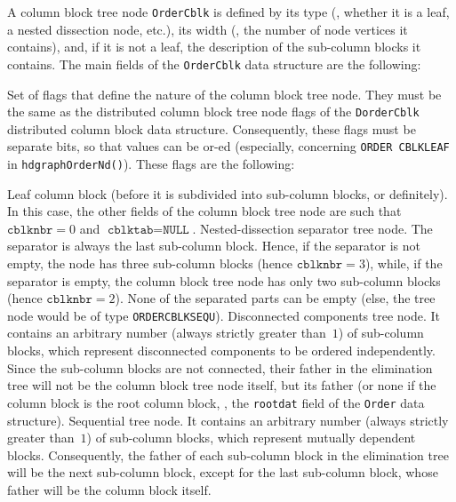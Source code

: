 A column block tree node \texttt{OrderCblk} is defined by its type
(\ie, whether it is a leaf, a nested dissection node, etc.), its width
(\ie, the number of node vertices it contains), and, if it is not a
leaf, the description of the sub-column blocks it contains.
The main fields of the \texttt{OrderCblk} data structure are the
following:
\begin{itemize}
  Set of flags that define the nature of the column block tree
  node. They must be the same as the distributed column block tree
  node flags of the \texttt{Dorder\lbt Cblk} distributed column block
  data structure. Consequently, these flags must be separate bits, so
  that values can be or-ed (especially, concerning \texttt{ORDER\lbt
  CBLK\lbt LEAF} in \texttt{hdgraph\lbt Order\lbt Nd()}).
  These flags are the following:
  \begin{itemize}
    Leaf column block (before it is subdivided into sub-column blocks,
    or definitely). In this case, the other fields of the column block
    tree node are such that $\texttt{cblknbr} = 0$ and
    $\texttt{cblktab} = \texttt{NULL}$.
    Nested-dissection separator tree node. The separator is always
    the last sub-column block. Hence, if the separator is not empty,
    the node has three sub-column blocks (hence $\texttt{cblknbr} =
    3$), while, if the separator is empty, the column block tree node
    has only two sub-column blocks (hence $\texttt{cblknbr} = 2$).
    None of the separated parts can be empty (else, the tree node
    would be of type \texttt{ORDER\lbt CBLK\lbt SEQU}).
    Disconnected components tree node. It contains an arbitrary number
    (always strictly greater than~$1$) of sub-column blocks, which
    represent disconnected components to be ordered
    independently. Since the sub-column blocks are not connected,
    their father in the elimination tree will not be the column block
    tree node itself, but its father (or none if the column block is
    the root column block, \ie, the \texttt{rootdat} field of the
    \texttt{Order} data structure).
    Sequential tree node. It contains an arbitrary number
    (always strictly greater than~$1$) of sub-column blocks, which
    represent mutually dependent blocks. Consequently, the father of
    each sub-column block in the elimination tree will be the next
    sub-column block, except for the last sub-column block, whose
    father will be the column block itself.

\end{itemize}
\end{itemize}
